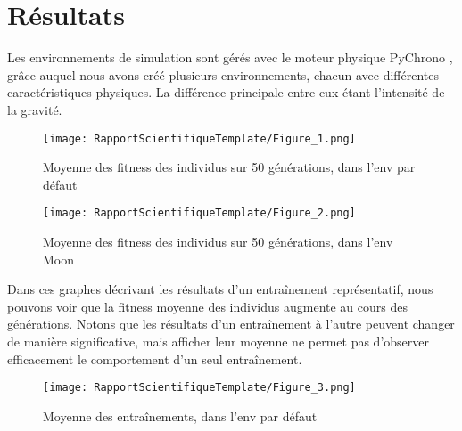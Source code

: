 \documentclass[journal, a4paper]{IEEEtran}
\begin{document}


\section{Résultats}

Les environnements de simulation sont gérés avec le moteur physique PyChrono \cite{PyChrono}, grâce auquel nous avons créé plusieurs environnements, chacun avec différentes caractéristiques physiques. La différence principale entre eux étant l'intensité de la gravité.


\begin{figure}[!htb]
  \centering
  \texttt{[image: RapportScientifiqueTemplate/Figure\_1.png]}
  \caption{Moyenne des fitness des individus sur 50 générations, dans l'env par défaut}
  \label{fig:default}
\end{figure}

\begin{figure}[!htb]
  \centering
  \texttt{[image: RapportScientifiqueTemplate/Figure\_2.png]}
  \caption{Moyenne des fitness des individus sur 50 générations, dans l'env Moon}
  \label{fig:moon}
\end{figure}

Dans ces graphes décrivant les résultats d'un entraînement représentatif, nous pouvons voir que la fitness moyenne des individus augmente au cours des générations. Notons que les résultats d'un entraînement à l'autre peuvent changer de manière significative, mais afficher leur moyenne ne permet pas d'observer efficacement le comportement d'un seul entraînement. 

\begin{figure}[!htb]
  \centering
  \texttt{[image: RapportScientifiqueTemplate/Figure\_3.png]}
  \caption{Moyenne des entraînements, dans l'env par défaut}
  \label{fig:av}
\end{figure}
\end{document}
